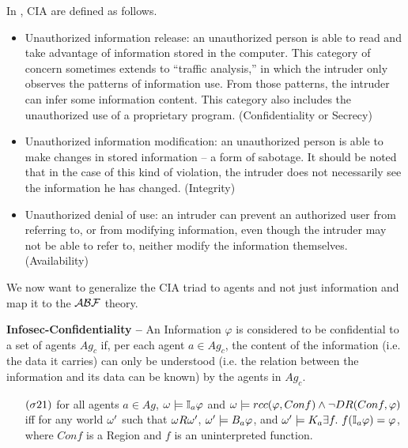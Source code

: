 In \autocite{Anderson1972report,Samonas2014cia}, CIA are defined as follows.
\begin{itemize}
	\item Unauthorized information release: an unauthorized person is able
		to read and take  advantage  of  information  stored  in  the
		computer.  This  category of concern  sometimes  extends  to
		``traffic  analysis,''  in  which  the intruder  only observes
		the  patterns  of  information  use.  From  those patterns,
		the  intruder can   infer   some   information   content.
		This category   also   includes   the unauthorized use of a
		proprietary program.  (Confidentiality or Secrecy) 
	\item Unauthorized  information  modification:  an  unauthorized person
		is  able  to make changes in stored information -- a form  of
		sabotage.  It should be noted that in the case of this kind of
		violation, the intruder does not necessarily see the
		information he has changed.  (Integrity)
	\item Unauthorized  denial  of  use:  an  intruder  can  prevent  an
		authorized  user  from referring to, or from modifying
		information, even though the intruder may not be able to refer
		to, neither modify the information themselves. (Availability)
\end{itemize}

We now want to generalize the CIA triad to agents and not just 
information and map it to the $\mathcal{A}\mathcal{B}\mathcal{F}$ theory.
\begin{definition}{\bf Infosec-Confidentiality --}\label{def:infosec-c}
	An Information $\varphi$ is considered to be confidential to a set of 
	agents $Ag_c$ if, per each agent $a\in Ag_c$, the content of the
	information (i.e. the data it carries) can only be understood (i.e. the relation
	between the information and its data can be known) by the
	agents in $Ag_c$.

	\begin{itemize}
		\item[$(\sigma21)$] for all agents $a\in Ag$,
			$\omega\models\mathbb{I}_{a}{\varphi}$ and
			$\omega\models rcc(\varphi,Conf) \wedge
			\neg DR(Conf,\varphi)$ iff for any world $\omega'$
			such that $\omega R\omega'$,
			$\omega'\models B_{a}\varphi$, and
			$\omega'\models K_{a}\exists f.~
			f(\mathbb{I}_{a}{\varphi})=\varphi$, where 
			$Conf$ is a Region and $f$ is an uninterpreted function.
	\end{itemize}
\end{definition}

